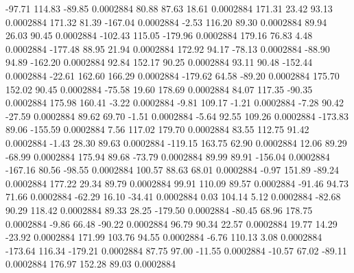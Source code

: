       -97.71      114.83      -89.85     0.0002884
       80.88       87.63       18.61     0.0002884
      171.31       23.42       93.13     0.0002884
      171.32       81.39     -167.04     0.0002884
       -2.53      116.20       89.30     0.0002884
       89.94       26.03       90.45     0.0002884
     -102.43      115.05     -179.96     0.0002884
      179.16       76.83        4.48     0.0002884
     -177.48       88.95       21.94     0.0002884
      172.92       94.17      -78.13     0.0002884
      -88.90       94.89     -162.20     0.0002884
       92.84      152.17       90.25     0.0002884
       93.11       90.48     -152.44     0.0002884
      -22.61      162.60      166.29     0.0002884
     -179.62       64.58      -89.20     0.0002884
      175.70      152.02       90.45     0.0002884
      -75.58       19.60      178.69     0.0002884
       84.07      117.35      -90.35     0.0002884
      175.98      160.41       -3.22     0.0002884
       -9.81      109.17       -1.21     0.0002884
       -7.28       90.42      -27.59     0.0002884
       89.62       69.70       -1.51     0.0002884
       -5.64       92.55      109.26     0.0002884
     -173.83       89.06     -155.59     0.0002884
        7.56      117.02      179.70     0.0002884
       83.55      112.75       91.42     0.0002884
       -1.43       28.30       89.63     0.0002884
     -119.15      163.75       62.90     0.0002884
       12.06       89.29      -68.99     0.0002884
      175.94       89.68      -73.79     0.0002884
       89.99       89.91     -156.04     0.0002884
     -167.16       80.56      -98.55     0.0002884
      100.57       88.63       68.01     0.0002884
       -0.97      151.89      -89.24     0.0002884
      177.22       29.34       89.79     0.0002884
       99.91      110.09       89.57     0.0002884
      -91.46       94.73       71.66     0.0002884
      -62.29       16.10      -34.41     0.0002884
        0.03      104.14        5.12     0.0002884
      -82.68       90.29      118.42     0.0002884
       89.33       28.25     -179.50     0.0002884
      -80.45       68.96      178.75     0.0002884
       -9.86       66.48      -90.22     0.0002884
       96.79       90.34       22.57     0.0002884
       19.77       14.29      -23.92     0.0002884
      171.99      103.76       94.55     0.0002884
       -6.76      110.13        3.08     0.0002884
     -173.64      116.34     -179.21     0.0002884
       87.75       97.00      -11.55     0.0002884
      -10.57       67.02      -89.11     0.0002884
      176.97      152.28       89.03     0.0002884
